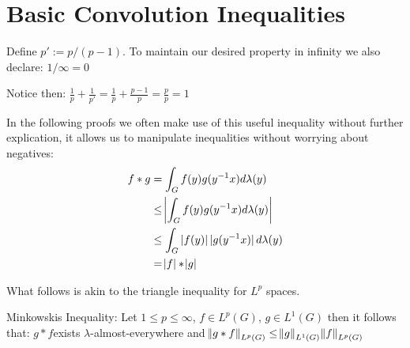 \section{Basic Convolution Inequalities}

\begin{definition}
Define $ p' := p / (p-1) $. To maintain our desired property in infinity we also declare: $1 / \infty = 0$
\end{definition}

\begin{remark}
Notice then: $\frac{1}{p} + \frac{1}{p'} = \frac{1}{p} + \frac{p-1}{p} = \frac{p}{p} = 1$
\end{remark}

\begin{remark}
In the following proofs we often make use of this useful inequality without further explication, it allows us to manipulate inequalities without worrying about negatives:
\begin{align*}
f \ast g &= \int_G f(y)g(y^{-1}x) d\lambda(y) \\
&\leq \abs{ \int_G f(y)g(y^{-1}x) d\lambda(y) } \\
&\leq \int_G \abs[0]{f(y)}\abs[0]{g(y^{-1}x)} d\lambda(y) \\
&= \abs{f} \ast \abs{g}
\end{align*}
\end{remark}

What follows is akin to the triangle inequality for $L^p$ spaces.

\begin{theorem}
Minkowskis Inequality: Let $1 \leq p \leq \infty$, $f \in L^p (G)$, $g \in L^1(G)$ then it follows that: 
$g \ast f $exists $\lambda$-almost-everywhere and
$ \norm{g \ast f}_{L^p(G)} \leq \norm{g}_{L^1(G)} \norm{f}_{L^p(G)} $
\end{theorem}

